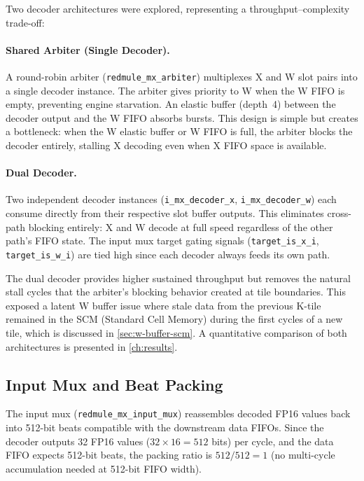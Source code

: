Two decoder architectures were explored, representing a throughput--complexity
trade-off:

\paragraph{Shared Arbiter (Single Decoder).}
A round-robin arbiter (\texttt{redmule\_mx\_arbiter}) multiplexes X and W slot
pairs into a single decoder instance. The arbiter gives priority to W when the
W FIFO is empty, preventing engine starvation. An elastic buffer (depth~4)
between the decoder output and the W FIFO absorbs bursts. This design is
simple but creates a bottleneck: when the W elastic buffer or W FIFO is full,
the arbiter blocks the decoder entirely, stalling X decoding even when X FIFO
space is available.

\paragraph{Dual Decoder.}
Two independent decoder instances (\texttt{i\_mx\_decoder\_x},
\texttt{i\_mx\_decoder\_w}) each consume directly from their respective slot
buffer outputs. This eliminates cross-path blocking entirely: X and W decode at
full speed regardless of the other path's FIFO state. The input mux target
gating signals (\texttt{target\_is\_x\_i}, \texttt{target\_is\_w\_i}) are tied
high since each decoder always feeds its own path.

The dual decoder provides higher sustained throughput but removes the natural
stall cycles that the arbiter's blocking behavior created at tile boundaries.
This exposed a latent W buffer issue where stale data from the previous K-tile
remained in the SCM (Standard Cell Memory) during the first cycles of a new
tile, which is discussed in \autoref{sec:w-buffer-scm}. A quantitative
comparison of both architectures is presented in \autoref{ch:results}.

\subsection{Input Mux and Beat Packing}
\label{ssec:input-mux}

The input mux (\texttt{redmule\_mx\_input\_mux}) reassembles decoded FP16
values back into 512-bit beats compatible with the downstream data FIFOs. Since
the decoder outputs 32 FP16 values ($32 \times 16 = 512$ bits) per cycle, and
the data FIFO expects 512-bit beats, the packing ratio is $512/512 = 1$
(no multi-cycle accumulation needed at 512-bit FIFO width).

